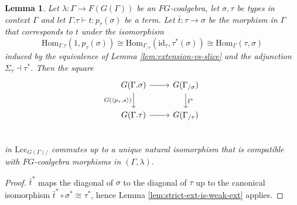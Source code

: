 \documentclass[a4paper]{article}
\newtheorem{lemma}[theorem]{Lemma}
\theoremstyle{remark}
\theoremstyle{definition}
\begin{document}
\begin{lemma}
  \label{lem:substitution-vs-pullback}
  Let $\lambda : \Gamma \rightarrow F(G(\Gamma))$ be an $FG$-coalgebra, let $\sigma, \tau$ be types in context $\Gamma$ and let $\Gamma.\tau \vdash t : p_\tau(\sigma)$ be a term.
  Let $\bar t : \tau \rightarrow \sigma$ be the morphism in $\Gamma$ that corresponds to $t$ under the isomorphism
  \begin{equation}
    \mathrm{Hom}_{\Gamma.\tau}(1, p_\tau(\sigma)) \cong \mathrm{Hom}_{\Gamma_{/ \tau}}(\mathrm{id}_\tau, \tau^*(\sigma)) \cong \mathrm{Hom}_\Gamma(\tau, \sigma)
  \end{equation}
  induced by the equivalence of Lemma \ref{lem:extension-vs-slice} and the adjunction $\Sigma_\tau \dashv \tau^*$.
  Then the square
  \begin{equation}
    \begin{tikzcd}
      G(\Gamma.\sigma) \arrow[r] \arrow[d, "{G(\langle p_\tau, s \rangle)}"'] & G(\Gamma_{/ \sigma}) \arrow[d, "\bar t^*"] \\
      G(\Gamma.\tau) \arrow[r] & G(\Gamma_{/ \tau}) \\
    \end{tikzcd}
  \end{equation}
  in $\mathrm{Lcc}_{G(\Gamma)/ }$ commutes up to a unique natural isomorphism that is compatible with $FG$-coalgebra morphisms in $(\Gamma, \lambda)$.
\end{lemma}
\begin{proof}
  $\bar t^*$ maps the diagonal of $\sigma$ to the diagonal of $\tau$ up to the canonical isomorphism $\bar t^* \circ \sigma^* \cong \tau^*$, hence Lemma \ref{lem:strict-ext-is-weak-ext} applies.
\end{proof}
\end{document}
